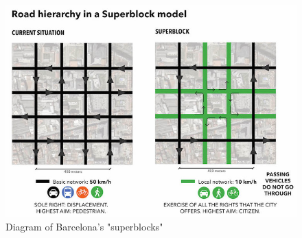 \documentclass[12pt]{article}                       %
\begin{document}
\begin{figure}[H]
    \centering
    \includegraphics[scale=4.5]{images/barcelona_superblock.jpg}
    \caption{Diagram of Barcelona's "superblocks"}
    \label{img:barcelona_superblock}
\end{figure}
\end{document}
